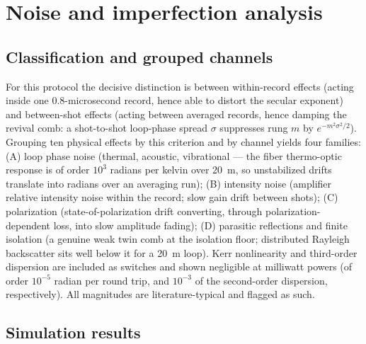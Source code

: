 \documentclass[11pt,a4paper]{article}
\begin{document}
\section{Noise and imperfection analysis}
\label{sec:noise}

\subsection{Classification and grouped channels}

For this protocol the decisive distinction is between within-record effects
(acting inside one 0.8-microsecond record, hence able to distort the secular
exponent) and between-shot effects (acting between averaged records, hence
damping the revival comb: a shot-to-shot loop-phase spread $\sigma$ suppresses
rung $m$ by $e^{-m^2 \sigma^2 / 2}$). Grouping ten physical effects by this
criterion and by channel yields four families: (A) loop phase noise (thermal,
acoustic, vibrational --- the fiber thermo-optic response is of order $10^3$
radians per kelvin over 20~m, so unstabilized drifts translate into radians
over an averaging run); (B) intensity noise (amplifier relative intensity noise
within the record; slow gain drift between shots); (C) polarization
(state-of-polarization drift converting, through polarization-dependent loss,
into slow amplitude fading); (D) parasitic reflections and finite isolation (a
genuine weak twin comb at the isolation floor; distributed Rayleigh backscatter
sits well below it for a 20~m loop). Kerr nonlinearity and third-order
dispersion are included as switches and shown negligible at milliwatt powers
(of order $10^{-5}$ radian per round trip, and $10^{-3}$ of the second-order
dispersion, respectively). All magnitudes are literature-typical and flagged as
such.

\subsection{Simulation results}
\end{document}
